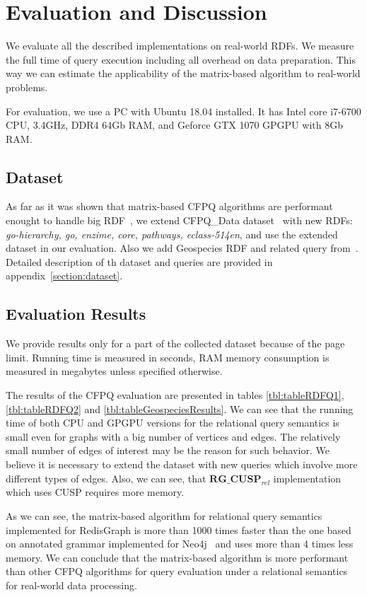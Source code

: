 \section{Evaluation and Discussion}

We evaluate all the described implementations on real-world RDFs.
We measure the full time of query execution including all overhead on data preparation.
This way we can estimate the applicability of the matrix-based algorithm to real-world problems.

For evaluation, we use a PC with Ubuntu 18.04 installed.
It has Intel core i7-6700 CPU, 3.4GHz, DDR4 64Gb RAM, and Geforce GTX 1070 GPGPU with 8Gb RAM.

\subsection{Dataset}
As far as it was shown that matrix-based CFPQ algorithms are performant enought to handle big RDF~\cite{Mishin:2019:ECP:3327964.3328503}, we extend CFPQ\_Data dataset~\cite{Mishin:2019:ECP:3327964.3328503} with new RDFs: \textit{go-hierarchy, go, enzime, core, pathways, eclass-514en}, and use the extended dataset in our evaluation. Also we add Geospecies RDF and related query from~\cite{Kuijpers:2019:ESC:3335783.3335791}. 
Detailed description of th dataset and queries are provided in appendix~\ref{section:dataset}.


\subsection{Evaluation Results}
We provide results only for a part of the collected dataset because of the page limit.
Running time is measured in seconds, RAM memory consumption is measured in megabytes unless specified otherwise.

The results of the CFPQ evaluation are presented in tables \ref{tbl:tableRDFQ1}, \ref{tbl:tableRDFQ2} and \ref{tbl:tableGeospeciesResults}.
We can see that the running time of both CPU and GPGPU versions for the relational query semantics is small even for graphs with a big number of vertices and edges.
The relatively small number of edges of interest may be the reason for such behavior.
We believe it is necessary to extend the dataset with new queries which involve more different types of edges.
Also, we can see, that $\textbf{RG\_CUSP}_{\textit{rel}}$ implementation which uses CUSP requires more memory.

As we can see, the matrix-based algorithm for relational query semantics implemented for RedisGraph is more than 1000 times faster than the one based on annotated grammar implemented for Neo4j~\cite{Kuijpers:2019:ESC:3335783.3335791} and uses more than 4 times less memory.
We can conclude that the matrix-based algorithm is more performant than other CFPQ algorithms for query evaluation under a relational semantics for real-world data processing.

